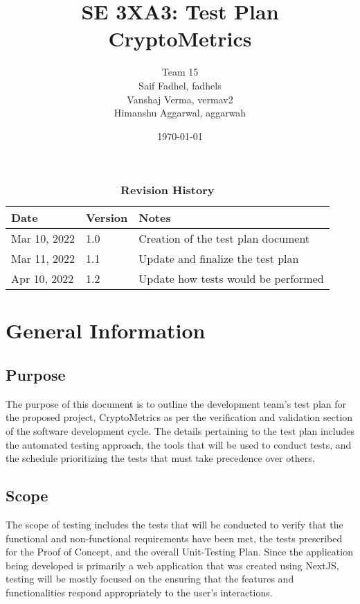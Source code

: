 \documentclass[12pt, titlepage]{article}
\title{SE 3XA3: Test Plan\\CryptoMetrics}
\author{Team 15
		\\ Saif Fadhel, fadhels
		\\ Vanshaj Verma, vermav2
		\\ Himanshu Aggarwal, aggarwah
}
\date{\today}
\begin{document}
\maketitle

\tableofcontents
\listoftables
\listoffigures

\begin{table}[bp]
\caption{\bf Revision History}
\begin{tabularx}{\textwidth}{p{3cm}p{2cm}X}
\toprule {\bf Date} & {\bf Version} & {\bf Notes}\\
\midrule
Mar 10, 2022 & 1.0 & Creation of the test plan document \\
Mar 11, 2022 & 1.1 & Update and finalize the test plan \\
Apr 10, 2022 & 1.2 & Update how tests would be performed \\
\bottomrule
\end{tabularx}
\end{table}

\newpage


\section{General Information}

\subsection{Purpose}

The purpose of this document is to outline the development team's test plan for the proposed project, CryptoMetrics as per the verification and validation section of the software development cycle. The details pertaining to the test plan includes the automated testing approach, the tools that will be used to conduct tests, and the schedule prioritizing the tests that must take precedence over others.

\subsection{Scope}

The scope of testing includes the tests that will be conducted to verify that the functional and non-functional requirements have been met, the tests prescribed for the Proof of Concept, and the overall Unit-Testing Plan. Since the application being developed is primarily a web application that was created using NextJS, testing will be mostly focused on the ensuring that the features and functionalities respond appropriately to the user's interactions.
\end{document}
